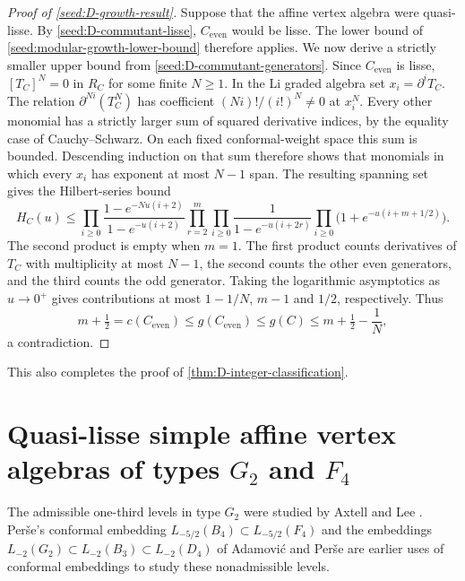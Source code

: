 \documentclass[11pt,a4paper]{amsart}
\numberwithin{equation}{section}
\theoremstyle{definition}
\theoremstyle{remark}
\begin{document}
\begin{proof}[Proof of \cref{seed:D-growth-result}]
Suppose that the affine vertex algebra were quasi-lisse. By
\cref{seed:D-commutant-lisse}, $C_{\mathrm{even}}$ would be lisse.
The lower bound of \cref{seed:modular-growth-lower-bound} therefore
applies. We now derive a strictly smaller upper bound from
\cref{seed:D-commutant-generators}.
Since $C_{\mathrm{even}}$ is lisse, $[T_C]^N=0$ in $R_C$ for
some finite $N\ge1$. In the Li graded algebra set $x_i=\partial^iT_C$.
The relation $\partial^{Ni}(T_C^N)$ has coefficient
$(Ni)!/(i!)^N\ne0$ at $x_i^N$. Every other monomial has a strictly larger sum of squared derivative
indices, by the equality case of Cauchy--Schwarz. On each fixed
conformal-weight space this sum is bounded. Descending induction on
that sum therefore shows that monomials in which every $x_i$ has
exponent at most $N-1$ span.
The resulting spanning set gives the Hilbert-series bound
$$
 H_C(u)\le
 \prod_{i\ge0}\frac{1-e^{-Nu(i+2)}}{1-e^{-u(i+2)}}
 \prod_{r=2}^{m}\prod_{i\ge0}\frac1{1-e^{-u(i+2r)}}
 \prod_{i\ge0}\bigl(1+e^{-u(i+m+1/2)}\bigr).
$$
The second product is empty when $m=1$. The first product counts
derivatives of $T_C$ with multiplicity at most $N-1$, the second
counts the other even generators, and the third counts the odd
generator. Taking the logarithmic asymptotics as $u\to0^+$ gives
contributions at most $1-1/N$, $m-1$ and $1/2$, respectively.
Thus
$$
 m+\tfrac12=c(C_{\mathrm{even}})
 \le g(C_{\mathrm{even}})\le g(C)
 \le m+\tfrac12-\frac1N,
$$
a contradiction.
\end{proof}
This also completes the proof of \cref{thm:D-integer-classification}.

\section{\texorpdfstring{Quasi-lisse simple affine vertex algebras of types $G_2$ and $F_4$}{Quasi-lisse simple affine vertex algebras of types G2 and F4}}\label{seed:FG}

The admissible one-third levels in type $G_2$ were studied by Axtell and Lee \cite{AxtellLee2011}.
Per\v se's conformal embedding $L_{-5/2}(B_4)\subset L_{-5/2}(F_4)$ \cite{PerseBF2007} and the embeddings
$L_{-2}(G_2)\subset L_{-2}(B_3)\subset L_{-2}(D_4)$ of Adamovi\'c and Per\v se \cite{APConformal2013}
are earlier uses of conformal embeddings to study these nonadmissible levels.
\end{document}
